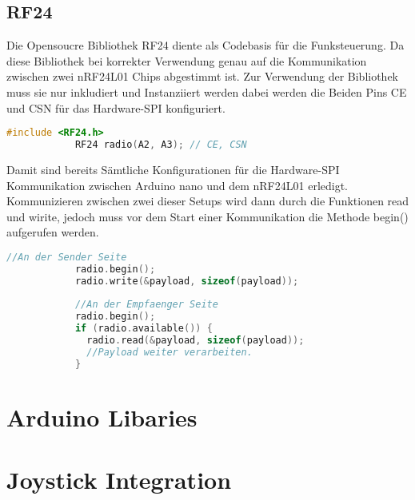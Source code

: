 \documentclass{article}
\begin{document}
    \subsection{RF24} %
       Die Opensoucre Bibliothek RF24 \cite{RF24_Lib} diente als Codebasis für die Funksteuerung. Da diese Bibliothek bei korrekter Verwendung genau auf die Kommunikation zwischen zwei nRF24L01 Chips abgestimmt ist.
       Zur Verwendung der Bibliothek muss sie nur inkludiert und Instanziiert werden dabei werden die Beiden Pins CE und CSN für das Hardware-SPI konfiguriert.
       
       \begin{file}[RF24 initialisieren]
        \begin{lstlisting}[language=C++]
            #include <RF24.h>
            RF24 radio(A2, A3); // CE, CSN
        \end{lstlisting}
        \end{file}
        
        Damit sind bereits Sämtliche Konfigurationen für die Hardware-SPI Kommunikation zwischen Arduino nano und dem nRF24L01 erledigt.
        Kommunizieren zwischen zwei dieser Setups wird dann durch die Funktionen read und wirite, jedoch muss vor dem Start einer Kommunikation die Methode begin() aufgerufen werden.
       \begin{file}[RF24 initialisieren]
        \begin{lstlisting}[language=C++]
            //An der Sender Seite
            radio.begin();
            radio.write(&payload, sizeof(payload));
            
            //An der Empfaenger Seite
            radio.begin();
            if (radio.available()) {
              radio.read(&payload, sizeof(payload));
              //Payload weiter verarbeiten.
            }
        \end{lstlisting}
        \end{file} 
        
    
\newpage
\section{Arduino Libaries} %

\newpage
\section{Joystick Integration} %
\end{document}

